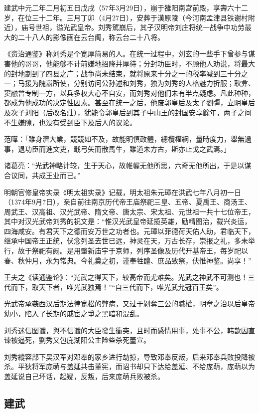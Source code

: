 建武中元二年二月初五日戊戌（57年3月29日），崩于雒阳南宫前殿，享壽六十二岁，在位三十二年。三月丁卯（4月27日），安葬于漢原陵（今河南孟津县铁谢村附近），庙号世祖，谥光武皇帝。刘秀駕崩后，其子汉明帝刘庄将统一战争中功劳最大的二十八人的影像画在云台阁，称云台二十八将。

《资治通鉴》称刘秀是个宽厚简易的人。在统一过程中，刘玄的一些手下曾参与谋害他的哥哥，他能够不计前嫌地招降并厚待；分封功臣时，不顾他人劝说，将最大的封地劃到了四县之广；战争尚未结束，就将原来十分之一的税率减到三十分之一；马援为隗嚣所使，分别访问公孙述和刘秀，独为刘秀的人格魅力折服；耿弇、窦融曾专制一方，以兵多权大心不自安，而刘秀对他们未有半点疑虑。凡此种种，都成为他成功的决定性因素。甚至在统一之后，他废郭皇后及太子劉彊，立阴皇后及次子刘阳（后改名莊），犹能令郭皇后到其子中山王的封国安享餘年，两子之间不生嫌隙，也没有受到臣下及后人的议论。

范曄：「雖身濟大業，競競如不及，故能明慎政體，總欖權綱，量時度力，舉無過事，退功臣而進文吏，戢弓矢而散馬牛，雖道未方古，斯亦止戈之武焉。」

诸葛亮：“光武神略计较，生于天心，故帷幄无他所思，六奇无他所出，于是以谋合议同，共成王业而已。”

明朝官修皇帝实录《明太祖实录》记载，明太祖朱元璋在洪武七年八月初一日（1374年9月7日），亲自前往南京历代帝王庙祭祀三皇、五帝、夏禹王、商汤王、周武王、汉高祖、汉光武帝、隋文帝、唐太宗、宋太祖、元世祖一共十七位帝王，其中对汉光武帝刘秀的祝文是：“惟汉光武皇帝延揽英雄，励精图治，载兴炎运，四海咸安。有君天下之德而安万世之功者也。元璋以菲德荷天佑人助，君临天下，继承中国帝王正统，伏念列圣去世已远，神灵在天，万古长存，崇报之礼，多未举行，故于祭祀有阙。是用肇新庙宇于京师，列序圣像及历代开基帝王，每岁祀以春、秋仲月，永为常典。今礼奠之初，谨奉牲醴、庶品致祭，伏惟神鉴。尚享！”

王夫之《读通鉴论》：“光武之得天下，较高帝而尤难矣。光武之神武不可测也！三代而下，取天下者，唯光武独焉！”“自三代而下，唯光武允冠百王矣”。

光武帝承袭西汉后期法律宽松的弊病，又过于剝奪三公的職權，明章之治以后皇帝幼小，陷入了长期的戚宦之爭之黑暗和混乱。

刘秀迷信图谶，與不信谶的大臣發生衝突，且时而感情用事，处事不公，韩歆因直谏被逼死，劉秀又包庇湖阳公主险些杀死董宣。

刘秀縱容部下吴汉军对邓奉的家乡进行劫掠，导致邓奉反叛，后来邓奉兵败投降被杀。平狄将军庞萌与盖延共击董宪，而诏书却只下达给盖延、不给庞萌，庞萌以为盖延说自己坏话，起疑，反叛，后来庞萌兵败被杀。

\subsection{建武}

